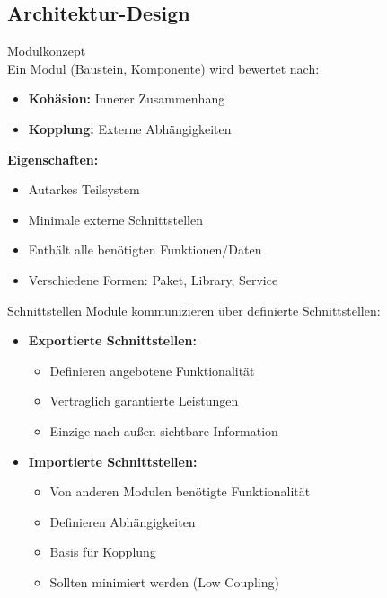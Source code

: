 \columnbreak

\subsection{Architektur-Design}

\begin{concept}{Modulkonzept}\\
Ein Modul (Baustein, Komponente) wird bewertet nach:
\begin{itemize}
    \item \textbf{Kohäsion:} Innerer Zusammenhang
    \item \textbf{Kopplung:} Externe Abhängigkeiten
\end{itemize}

\textbf{Eigenschaften:}
\begin{itemize}
    \item Autarkes Teilsystem
    \item Minimale externe Schnittstellen
    \item Enthält alle benötigten Funktionen/Daten
    \item Verschiedene Formen: Paket, Library, Service
\end{itemize}
\end{concept}

\begin{definition}{Schnittstellen}
Module kommunizieren über definierte Schnittstellen:

\begin{itemize}
    \item \textbf{Exportierte Schnittstellen:}
    \begin{itemize}
        \item Definieren angebotene Funktionalität
        \item Vertraglich garantierte Leistungen
        \item Einzige nach außen sichtbare Information
    \end{itemize}
    
    \item \textbf{Importierte Schnittstellen:}
    \begin{itemize}
        \item Von anderen Modulen benötigte Funktionalität
        \item Definieren Abhängigkeiten
        \item Basis für Kopplung
        \item Sollten minimiert werden (Low Coupling)
    \end{itemize}
\end{itemize}
\end{definition}

